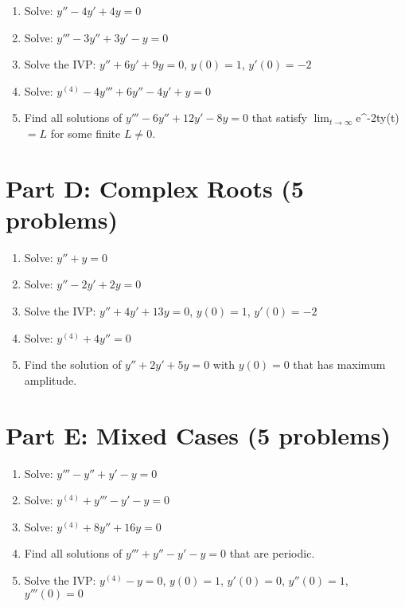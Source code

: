 \documentclass[12pt]{article}
\begin{document}
\begin{enumerate}[resume]
\item Solve: $y'' - 4y' + 4y = 0$

\item Solve: $y''' - 3y'' + 3y' - y = 0$

\item Solve the IVP: $y'' + 6y' + 9y = 0$, $y(0) = 1$, $y'(0) = -2$

\item Solve: $y^{(4)} - 4y''' + 6y'' - 4y' + y = 0$

\item Find all solutions of $y''' - 6y'' + 12y' - 8y = 0$ that satisfy $\lim_{t \to \infty} $e^{-2t}y(t)$ = L$ for some finite $L \neq 0$.
\end{enumerate}

\section*{Part D: Complex Roots (5 problems)}

\begin{enumerate}[resume]
\item Solve: $y'' + y = 0$

\item Solve: $y'' - 2y' + 2y = 0$

\item Solve the IVP: $y'' + 4y' + 13y = 0$, $y(0) = 1$, $y'(0) = -2$

\item Solve: $y^{(4)} + 4y'' = 0$

\item Find the solution of $y'' + 2y' + 5y = 0$ with $y(0) = 0$ that has maximum amplitude.
\end{enumerate}

\section*{Part E: Mixed Cases (5 problems)}

\begin{enumerate}[resume]
\item Solve: $y''' - y'' + y' - y = 0$

\item Solve: $y^{(4)} + y''' - y' - y = 0$

\item Solve: $y^{(4)} + 8y'' + 16y = 0$

\item Find all solutions of $y''' + y'' - y' - y = 0$ that are periodic.

\item Solve the IVP: $y^{(4)} - y = 0$, $y(0) = 1$, $y'(0) = 0$, $y''(0) = 1$, $y'''(0) = 0$
\end{enumerate}
\end{document}
